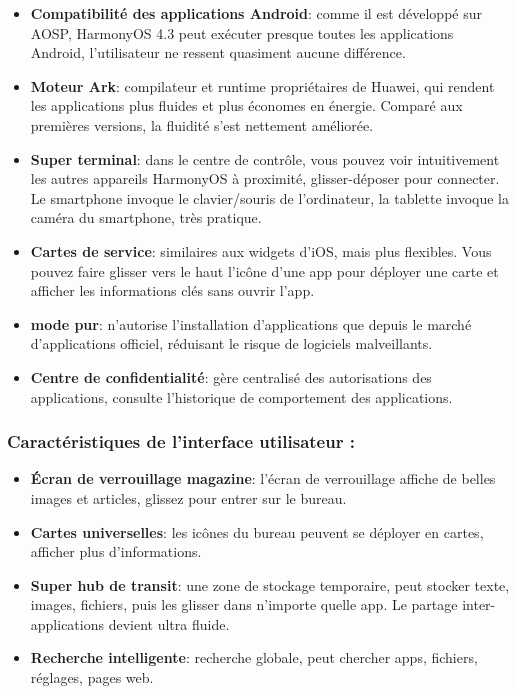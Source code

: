 \begin{itemize}
  \item \textbf{Compatibilité des applications Android}: comme il est développé sur AOSP, HarmonyOS 4.3 peut exécuter presque toutes les applications Android, l'utilisateur ne ressent quasiment aucune différence.
  \item \textbf{Moteur Ark}: compilateur et runtime propriétaires de Huawei, qui rendent les applications plus fluides et plus économes en énergie. Comparé aux premières versions, la fluidité s'est nettement améliorée.
  \item \textbf{Super terminal}: dans le centre de contrôle, vous pouvez voir intuitivement les autres appareils HarmonyOS à proximité, glisser-déposer pour connecter. Le smartphone invoque le clavier/souris de l'ordinateur, la tablette invoque la caméra du smartphone, très pratique.
  \item \textbf{Cartes de service}: similaires aux widgets d'iOS, mais plus flexibles. Vous pouvez faire glisser vers le haut l'icône d'une app pour déployer une carte et afficher les informations clés sans ouvrir l'app.
  \item \textbf{mode pur}: n'autorise l'installation d'applications que depuis le marché d'applications officiel, réduisant le risque de logiciels malveillants.
  \item \textbf{Centre de confidentialité}: gère centralisé des autorisations des applications, consulte l'historique de comportement des applications.
\end{itemize}

\subsubsection*{Caractéristiques de l'interface utilisateur :}

\begin{itemize}
  \item \textbf{Écran de verrouillage magazine}: l'écran de verrouillage affiche de belles images et articles, glissez pour entrer sur le bureau.
  \item \textbf{Cartes universelles}: les icônes du bureau peuvent se déployer en cartes, afficher plus d'informations.
  \item \textbf{Super hub de transit}: une zone de stockage temporaire, peut stocker texte, images, fichiers, puis les glisser dans n'importe quelle app. Le partage inter-applications devient ultra fluide.
  \item \textbf{Recherche intelligente}: recherche globale, peut chercher apps, fichiers, réglages, pages web.
\end{itemize}

